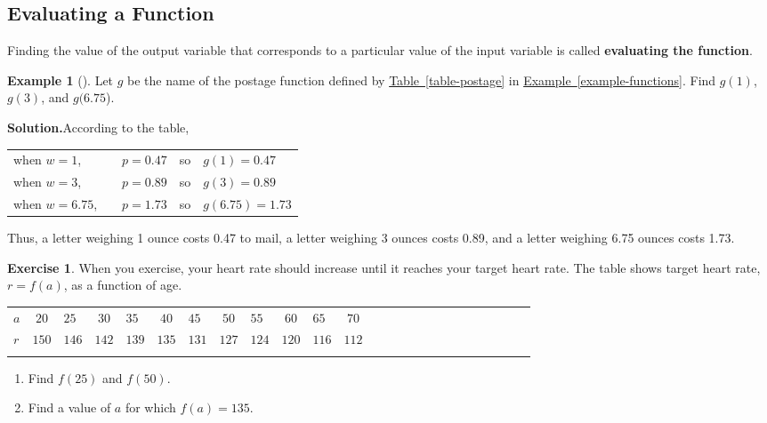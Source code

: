 \documentclass[10pt,]{book}
\newcommand{\terminology}[1]{\textbf{#1}}
\theoremstyle{plain}
\theoremstyle{definition}
\theoremstyle{definition}
\newtheorem{example}[theorem]{Example}
\theoremstyle{definition}
\newtheorem{exercise}[theorem]{Exercise}
\newcommand{\hrulethin}  {\noalign{\hrule height 0.04em}}
\newcommand{\hrulethick} {\noalign{\hrule height 0.11em}}
\begin{document}
\subsection[{Evaluating a Function}]{Evaluating a Function}\label{subsection-6}
Finding the value of the output variable that corresponds to a particular value of the input variable is called \terminology{evaluating the function}.%
\begin{example}[]\label{example-postage2}
Let \(g\) be the name of the postage function defined by \hyperref[table-postage]{Table~\ref{table-postage}}  in \hyperref[example-functions]{Example~\ref{example-functions}}. Find \(g(1)\), \(g(3)\), and \(g(6.75\)).%
\par\medskip\noindent%
\textbf{Solution.}\quad According to the table, \leavevmode%
\begin{table}
\centering
\begin{tabular}{lllll}
when \(w=1\),&&\(p=0.47\)&so&\(g(1)=0.47\)\tabularnewline[0pt]
when \(w=3\),&&\(p=0.89\)&so&\(g(3)=0.89\)\tabularnewline[0pt]
when \(w=6.75\),&&\(p=1.73\)&so&\(g(6.75)=1.73\)
\end{tabular}
\end{table}
 Thus, a letter weighing 1 ounce costs \textdollar{}0.47 to mail, a letter weighing 3 ounces costs \textdollar{}0.89, and a letter weighing 6.75 ounces costs \textdollar{}1.73.%
\end{example}
\begin{exercise}\label{exercise-heart-rate}
When you exercise, your heart rate should increase until it reaches your target heart rate. The table shows target heart rate, \(r = f(a)\), as a function of age. \begin{table}
\centering
\begin{tabular}{AcAcAcAcAcAcAcAcAcAcAcAcA}\hrulethick
\(a\)&\(20\)&\(25\)&\(30\)&\(35\)&\(40\)&\(45\)&\(50\)&\(55\)&\(60\)&\(65\)&\(70\)\tabularnewline\hrulethin
\(r\)&\(150\)&\(146\)&\(142\)&\(139\)&\(135\)&\(131\)&\(127\)&\(124\)&\(120\)&\(116\)&\(112\)\tabularnewline\hrulethin
\end{tabular}
\end{table}
\leavevmode%
\begin{enumerate}[label=\alph*]
\item\hypertarget{li-37}{}Find \(f(25)\) and \(f(50)\).%
\item\hypertarget{li-38}{}Find a value of \(a\) for which \(f(a) = 135\).%
\end{enumerate}
\end{exercise}
\end{document}
